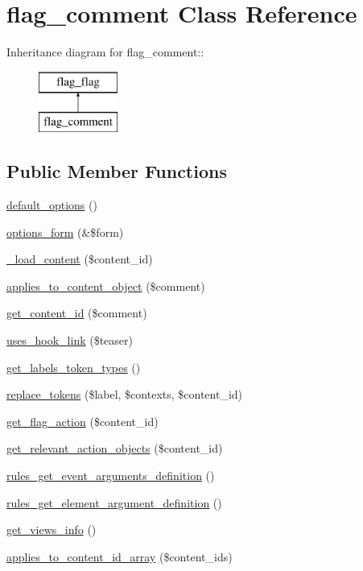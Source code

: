 \hypertarget{classflag__comment}{
\section{flag\_\-comment Class Reference}
\label{classflag__comment}
}
Inheritance diagram for flag\_\-comment::\begin{figure}[H]
\begin{center}
\leavevmode
\includegraphics[height=2cm]{classflag__comment}
\end{center}
\end{figure}
\subsection*{Public Member Functions}
\begin{CompactItemize}
\item 
\hyperlink{classflag__comment_022d24a6bb4afca5563c69e0ab50007f}{default\_\-options} ()
\item 
\hyperlink{classflag__comment_6497f5efb8c81036572b81b91736dfea}{options\_\-form} (\&\$form)
\item 
\hyperlink{classflag__comment_a2d056f6b6e161f1cf0a6886b5b7326b}{\_\-load\_\-content} (\$content\_\-id)
\item 
\hyperlink{classflag__comment_4941d3bede8159f596a40c6f8aea7b3b}{applies\_\-to\_\-content\_\-object} (\$comment)
\item 
\hyperlink{classflag__comment_69760ed8615fd076652d702a03c261aa}{get\_\-content\_\-id} (\$comment)
\item 
\hyperlink{classflag__comment_fae5770ee7dc6b4fc2ce56e99ac854bf}{uses\_\-hook\_\-link} (\$teaser)
\item 
\hyperlink{classflag__comment_9f6744e13e425967435db592d30cba69}{get\_\-labels\_\-token\_\-types} ()
\item 
\hyperlink{classflag__comment_6dc6170aac5518de159741316a38e6bf}{replace\_\-tokens} (\$label, \$contexts, \$content\_\-id)
\item 
\hyperlink{classflag__comment_9f4e0def33514ead29271f9628902d5c}{get\_\-flag\_\-action} (\$content\_\-id)
\item 
\hyperlink{classflag__comment_9092237266a5e5fce69be0a4cdfd602e}{get\_\-relevant\_\-action\_\-objects} (\$content\_\-id)
\item 
\hyperlink{classflag__comment_59dfcb8d0b77553cae330b3efb0beada}{rules\_\-get\_\-event\_\-arguments\_\-definition} ()
\item 
\hyperlink{classflag__comment_7b1d6ccaef3c1405005f8ff35878b2e2}{rules\_\-get\_\-element\_\-argument\_\-definition} ()
\item 
\hyperlink{classflag__comment_e3f7ebade72b8cdac4042de702d2978b}{get\_\-views\_\-info} ()
\item 
\hyperlink{classflag__comment_27a4b1110c52e7237c06dc6c3ad6c092}{applies\_\-to\_\-content\_\-id\_\-array} (\$content\_\-ids)
\end{CompactItemize}


